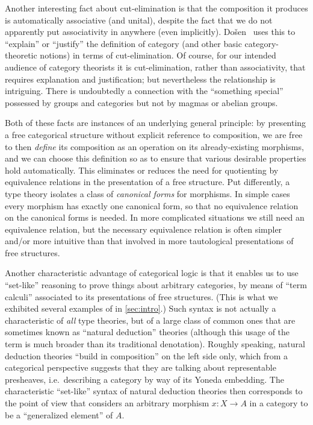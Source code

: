 Another interesting fact about cut-elimination is that the composition it produces is automatically associative (and unital), despite the fact that we do not apparently put associativity in anywhere (even implicitly).
Do\v{s}en~\cite{dosen:cutelim-cats} %
 uses this to ``explain'' or ``justify'' the definition of category (and other basic category-theoretic notions) in terms of cut-elimination.
Of course, for our intended audience of category theorists it is cut-elimination, rather than associativity, that requires explanation and justification; but nevertheless the relationship is intriguing.
There is undoubtedly a connection with the ``something special'' possessed by groups and categories but not by magmas or abelian groups.

Both of these facts are instances of an underlying general principle: by presenting a free categorical structure without explicit reference to composition, we are free to then \emph{define} its composition as an operation on its already-existing morphisms, and we can choose this definition so as to ensure that various desirable properties hold automatically.
This eliminates or reduces the need for quotienting by equivalence relations in the presentation of a free structure.
Put differently, a type theory isolates a class of \emph{canonical forms} for morphisms.
In simple cases every morphism has exactly one canonical form, so that no equivalence relation on the canonical forms is needed.
In more complicated situations we still need an equivalence relation, but the necessary equivalence relation is often simpler and/or more intuitive than that involved in more tautological presentations of free structures.

Another characteristic advantage of categorical logic is that it enables us to use ``set-like'' reasoning to prove things about arbitrary categories, by means of ``term calculi'' associated to its presentations of free structures.
(This is what we exhibited several examples of in \cref{sec:intro}.)
Such syntax is not actually a characteristic of \emph{all} type theories, but of a large class of common ones that are sometimes known as ``natural deduction'' theories (although this usage of the term is much broader than its traditional denotation).
Roughly speaking, natural deduction theories ``build in composition'' on the left side only, which from a categorical perspective suggests that they are talking about representable presheaves, i.e.\ describing a category by way of its Yoneda embedding.
The characteristic ``set-like'' syntax of natural deduction theories then corresponds to the point of view that considers an arbitrary morphism $x:X\to A$ in a category to be a ``generalized element'' of $A$.

